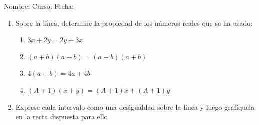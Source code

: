 \documentclass[letterpaper,fleqn]{article}
\newcommand{\LineaNombre}{%
\par
\vspace{\baselineskip}
Nombre:\hrulefill \; Curso: \underline{\hspace*{48pt}} \; Fecha: \underline{\hspace*{2.5cm}} \relax
\par}
\begin{document}
\LineaNombre
\begin{enumerate}
  \item Sobre la línea, determine la propiedad de los números reales que se ha usado:
  \begin{enumerate}
    \item $ 3x+2y=2y+3x $ \underline{\hspace{6cm}}
    \item $ (a+b)(a-b)=(a-b)(a+b) $ \underline{\hspace{6cm}}
    \item $ 4(a+b)=4a+4b $ \underline{\hspace{6cm}}
    \item $ (A+1)(x+y)=(A+1)x+(A+1)y $ \underline{\hspace{6cm}}
  \end{enumerate}
  \item Exprese cada intervalo como una desigualdad sobre la línea y luego grafíquela en la recta dispuesta para ello
  

\end{enumerate}
\end{document}
